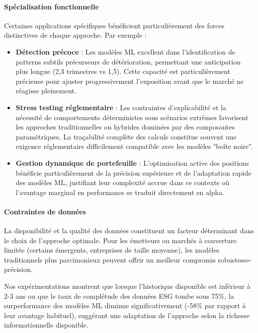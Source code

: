 \paragraph{Spécialisation fonctionnelle} Certaines applications spécifiques bénéficient particulièrement des forces distinctives de chaque approche. Par exemple :

\begin{itemize}
    \item \textbf{Détection précoce} : Les modèles ML excellent dans l'identification de patterns subtils précurseurs de détérioration, permettant une anticipation plus longue (2,3 trimestres vs 1,5). Cette capacité est particulièrement précieuse pour ajuster progressivement l'exposition avant que le marché ne réagisse pleinement.
    
    \item \textbf{Stress testing réglementaire} : Les contraintes d'explicabilité et la nécessité de comportements déterministes sous scénarios extrêmes favorisent les approches traditionnelles ou hybrides dominées par des composantes paramétriques. La traçabilité complète des calculs constitue souvent une exigence réglementaire difficilement compatible avec les modèles "boîte noire".
    
    \item \textbf{Gestion dynamique de portefeuille} : L'optimisation active des positions bénéficie particulièrement de la précision supérieure et de l'adaptation rapide des modèles ML, justifiant leur complexité accrue dans ce contexte où l'avantage marginal en performance se traduit directement en alpha.
\end{itemize}

\paragraph{Contraintes de données} La disponibilité et la qualité des données constituent un facteur déterminant dans le choix de l'approche optimale. Pour les émetteurs ou marchés à couverture limitée (certains émergents, entreprises de taille moyenne), les modèles traditionnels plus parcimonieux peuvent offrir un meilleur compromis robustesse-précision.

Nos expérimentations montrent que lorsque l'historique disponible est inférieur à 2-3 ans ou que le taux de complétude des données ESG tombe sous 75\%, la surperformance des modèles ML diminue significativement (-58\% par rapport à leur avantage habituel), suggérant une adaptation de l'approche selon la richesse informationnelle disponible.

